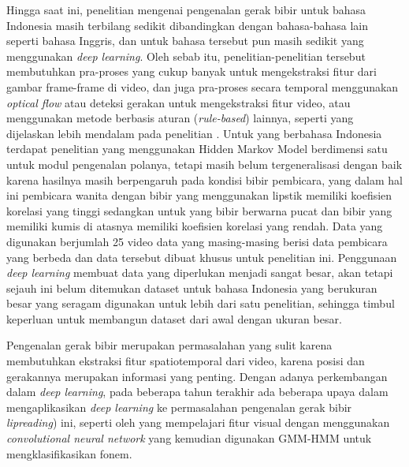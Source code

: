 Hingga saat ini, penelitian mengenai pengenalan gerak bibir untuk bahasa Indonesia masih terbilang sedikit dibandingkan dengan bahasa-bahasa lain seperti bahasa Inggris, dan untuk bahasa tersebut pun masih sedikit yang menggunakan \textit{deep learning}. Oleh sebab itu, penelitian-penelitian tersebut membutuhkan pra-proses yang cukup banyak untuk mengekstraksi fitur dari gambar frame-frame di video, dan juga pra-proses secara temporal menggunakan \textit{optical flow} atau deteksi gerakan untuk mengekstraksi fitur video, atau menggunakan metode berbasis aturan (\textit{rule-based}) lainnya, seperti yang dijelaskan lebih mendalam pada penelitian \textcite{Zhou2014}. Untuk yang berbahasa Indonesia terdapat penelitian \textcite{Achmad2015} yang menggunakan Hidden Markov Model berdimensi satu untuk modul pengenalan polanya, tetapi masih belum tergeneralisasi dengan baik karena hasilnya masih berpengaruh pada kondisi bibir pembicara, yang dalam hal ini pembicara wanita dengan bibir yang menggunakan lipstik memiliki koefisien korelasi yang tinggi sedangkan untuk yang bibir berwarna pucat dan bibir yang memiliki kumis di atasnya memiliki koefisien korelasi yang rendah. Data yang digunakan berjumlah 25 video data yang masing-masing berisi data pembicara yang berbeda dan data tersebut dibuat khusus untuk penelitian ini. Penggunaan \textit{deep learning} membuat data yang diperlukan menjadi sangat besar, akan tetapi sejauh ini belum ditemukan dataset untuk bahasa Indonesia yang berukuran besar yang seragam digunakan untuk lebih dari satu penelitian, sehingga timbul keperluan untuk membangun dataset dari awal dengan ukuran besar.
\bigskip

Pengenalan gerak bibir merupakan permasalahan yang sulit karena membutuhkan ekstraksi fitur spatiotemporal dari video, karena posisi dan gerakannya merupakan informasi yang penting. Dengan adanya perkembangan dalam \textit{deep learning}, pada beberapa tahun terakhir ada beberapa upaya dalam mengaplikasikan \textit{deep learning} ke permasalahan pengenalan gerak bibir \textit{lipreading}) ini, seperti oleh \textcite{Noda2014} yang mempelajari fitur visual dengan menggunakan \textit{convolutional neural network} yang kemudian digunakan GMM-HMM untuk mengklasifikasikan fonem.
\bigskip

